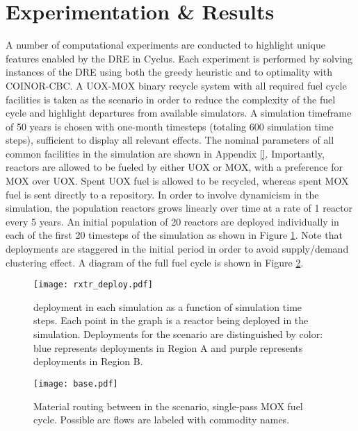 \section{Experimentation \& Results}\label{results}

A number of computational experiments are conducted to highlight unique features
enabled by the DRE in Cyclus. Each experiment is performed by solving instances
of the DRE using both the greedy heuristic and to optimality with COINOR-CBC. A
UOX-MOX binary recycle system with all required fuel cycle facilities is taken
as the \basecase scenario in order to reduce the complexity of the fuel cycle and
highlight departures from available simulators. A simulation timeframe of 50
years is chosen with one-month timesteps (totaling 600 simulation time steps),
sufficient to display all relevant effects. The nominal parameters of all common
facilities in the simulation are shown in Appendix \ref{}. Importantly, reactors
are allowed to be fueled by either UOX or MOX, with a preference for MOX over
UOX. Spent UOX fuel is allowed to be recycled, whereas spent MOX fuel is sent
directly to a repository. In order to involve dynamicism in the simulation, the
population reactors grows linearly over time at a rate of 1 reactor every 5
years. An initial population of 20 reactors are deployed individually in each of
the first 20 timesteps of the simulation as shown in Figure
\ref{fig:deploy}. Note that deployments are staggered in the initial period in
order to avoid supply/demand clustering effect. A diagram of the full
\basecase fuel cycle is shown in Figure \ref{fig:base}.

\begin{figure}
  \begin{center}
    \texttt{[image: rxtr\_deploy.pdf]}
    \caption[]{
      \label{fig:deploy}
      \reactor deployment in each simulation as a function of simulation time
      steps. Each point in the graph is a reactor being deployed in the
      simulation. Deployments for the \tariff scenario are distinguished by
      color: blue represents deployments in Region A and purple represents
      deployments in Region B.}
  \end{center}
\end{figure}

\begin{figure}
  \begin{center}
    \texttt{[image: base.pdf]}
    \caption[]{
      \label{fig:base}
      Material routing between in the \basecase scenario, single-pass MOX fuel
      cycle. Possible arc flows are labeled with commodity names.}
  \end{center}
\end{figure}

